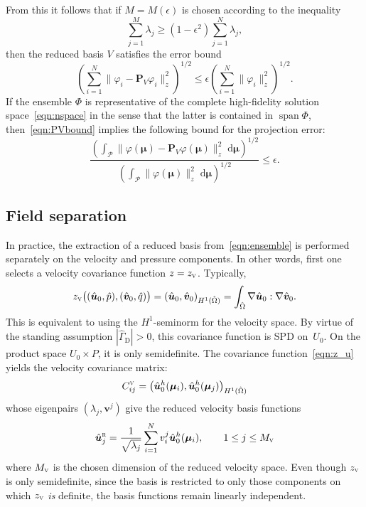 \documentclass[onecolumn, twoside, a4paper, 11pt]{article}
\newcommand{\dd}{{\;\mathrm{d}}}
\begin{document}
From this it follows that if $M = M(\epsilon)$ is chosen according to the inequality
\begin{equation}
  \label{eqn:error}
  \sum_{j=1}^M \lambda_j
  \geq \left(1 - \epsilon^2\right) \sum_{j=1}^N \lambda_j,
\end{equation}
%
then the reduced basis $V$ satisfies the error bound
%
\begin{equation}
\label{eqn:PVbound}
\left( \sum_{i=1}^N \big\| \varphi_i - \bm P_V \varphi_i \big\|_z^2 \right)^{1/2}
  \leq \epsilon \left( \sum_{i=1}^N \big\| \varphi_i \big\|_z^2 \right)^{1/2}.
\end{equation}
%
If the ensemble $\Phi$ is representative of the complete high-fidelity solution space~\eqref{eqn:nspace}
in the sense that the latter is contained in $\operatorname{span}\Phi$, then~\eqref{eqn:PVbound}
implies the following bound for the projection error:
%
\begin{equation}
\label{eqn:RBerror}
\frac{\left( \int_\mathcal{P}\big\|\varphi(\bm \mu) - \bm P_V \varphi(\bm \mu)\big\|_z^2\dd\bm \mu \right)^{1/2}}
{\left( \int_\mathcal{P} \big\| \varphi(\bm \mu) \big\|_z^2 \dd\bm \mu \right)^{1/2}}
  \leq \epsilon
  .
\end{equation}
%


\subsection{Field separation}
In practice, the extraction of a reduced basis from~\eqref{eqn:ensemble} is performed separately
on the velocity and pressure components. In other words, first one selects a velocity covariance
function $z=z_\textsc{v}$. Typically,
%
\begin{equation}
\label{eqn:z_u}
z_\textsc{v}\big((\hat{\bm u}_0, \hat{p}), (\hat{\bm v}_0, \hat{q})\big) =
  \left( \hat{\bm u}_0, \hat{\bm v}_0 \right)_{H^1(\hat{\Omega})}
  = \int_{\hat{\Omega}} \nabla \hat{\bm u}_0 : \nabla \hat{\bm v}_0.
\end{equation}
%
This is equivalent to using the $H^1$-seminorm for the velocity space. By virtue of the standing
assumption $|\hat{\Gamma}_\text{D}| > 0$, this covariance function is
SPD on~$U_0$. On the product space $U_0 \times P$, it is only semidefinite.
The covariance function~\eqref{eqn:z_u} yields the velocity covariance matrix:
%
\begin{equation}
  C^{\textsc{v}}_{ij} = \left( \hat{\bm u}^h_0(\bm{\mu}_i), \hat{\bm u}^h_0(\bm{\mu}_j) \right)_{H^1(\hat{\Omega})}
\end{equation}
%
whose eigenpairs $(\lambda_j, \bm v^{j})$ give the reduced velocity
basis functions
%
\begin{equation}
  \hat{\bm u}^\textsc{r}_j = \frac{1}{\sqrt{\lambda_j}} \sum_{i=1}^N v^{j}_i \hat{\bm u}^h_0(\bm{\mu}_i),
  \qquad 1 \leq j \leq M_\textsc{v}
\end{equation}
%
where $M_\textsc{v}$ is the chosen dimension of the reduced velocity space. Even though
$z_\textsc{v}$ is only semidefinite, since the basis is restricted to only those
components on which $z_\textsc{v}$ \emph{is} definite, the basis functions remain
linearly independent.
\end{document}
